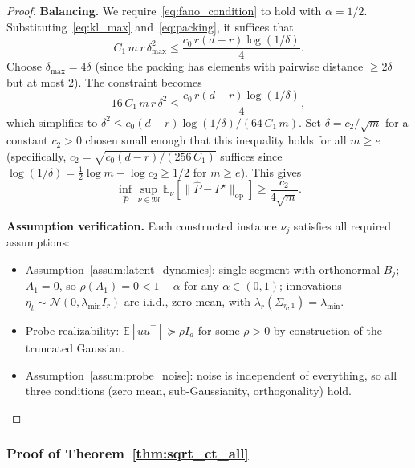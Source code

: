 \documentclass{article}
\newcommand{\E}{\mathbb{E}}
\newcommand{\op}{\mathrm{op}}
\begin{document}
\begin{proof}
\textbf{Balancing.}
We require~\eqref{eq:fano_condition} to hold with $\alpha = 1/2$.  Substituting~\eqref{eq:kl_max} and~\eqref{eq:packing}, it suffices that
\[
C_1\, m\, r\, \delta_{\max}^2 \le \frac{c_0\, r(d - r) \log(1/\delta)}{4}.
\]
Choose $\delta_{\max} = 4\delta$ (since the packing has elements with pairwise distance $\ge 2\delta$ but at most $2$).  The constraint becomes
\[
16\, C_1\, m\, r\, \delta^2 \le \frac{c_0\, r(d - r) \log(1/\delta)}{4},
\]
which simplifies to $\delta^2 \le c_0(d-r)\log(1/\delta)/(64\, C_1\, m)$.
Set $\delta = c_2 / \sqrt{m}$ for a constant $c_2 > 0$ chosen small enough that this inequality holds for all $m \ge e$ (specifically, $c_2 = \sqrt{c_0(d-r)/(256\, C_1)}$ suffices since $\log(1/\delta) = \frac{1}{2}\log m - \log c_2 \ge 1/2$ for $m \ge e$).  This gives
\[
\inf_{\widehat{P}} \sup_{\nu \in \mathfrak{M}} \E_\nu[\|\widehat{P} - P^\star\|_{\op}]
\ge \frac{c_2}{4\sqrt{m}}.
\]

\textbf{Assumption verification.}
Each constructed instance $\nu_j$ satisfies all required assumptions:
\begin{itemize}[nosep]
\item Assumption~\ref{assum:latent_dynamics}: single segment with orthonormal $B_j$; $A_1 = 0$, so $\rho(A_1) = 0 < 1 - \alpha$ for any $\alpha \in (0, 1)$; innovations $\eta_t \sim \mathcal{N}(0, \lambda_{\min} I_r)$ are i.i.d., zero-mean, with $\lambda_r(\Sigma_{\eta,1}) = \lambda_{\min}$.
\item Probe realizability: $\E[uu^\top] \succeq \rho I_d$ for some $\rho > 0$ by construction of the truncated Gaussian.
\item Assumption~\ref{assum:probe_noise}: noise is independent of everything, so all three conditions (zero mean, sub-Gaussianity, orthogonality) hold.  \qedhere
\end{itemize}
\end{proof}

\subsubsection{Proof of Theorem~\ref{thm:sqrt_ct_all}}
\label{proof:sqrt_ct_all}
\end{document}
